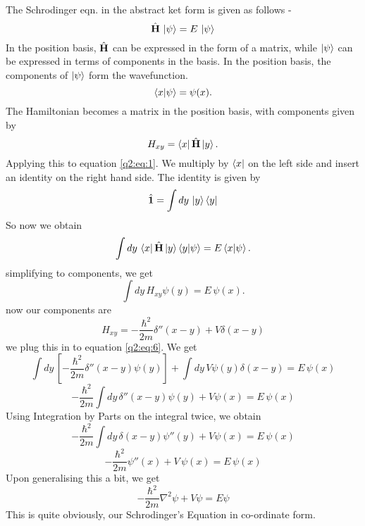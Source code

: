 
The Schrodinger eqn. in the abstract ket form is given as follows -
    \begin{equation} \label{q2:eq:1}
        \hat{\textbf{H}} \, \ket{\psi} = E\, \ket{\psi}
    \end{equation}
In the position basis, $\hat{\textbf{H}}$ can be expressed in the form of a matrix, while $\ket{\psi}$ can be expressed in terms of components in the basis.
In the position basis, the components of $\ket{\psi}$ form the wavefunction.
    \begin{equation}
        \braket{x}{\psi} = \psi(x).
    \end{equation}
The Hamiltonian becomes a matrix in the position basis, with components given by 
    \begin{equation}
        H_{xy} = \bra{x}\hat{\textbf{H}}\ket{y}.
    \end{equation}
Applying this to equation \ref{q2:eq:1}. We multiply by $\bra{x}$ on the left side and insert an identity on the right hand side.
The identity is given by 
    \begin{equation}
        \hat{\textbf{1}} = \int dy\, \ket{y}\bra{y}
    \end{equation}
So now we obtain 
    \begin{equation}
        \int dy\, \bra{x}\hat{\textbf{H}}\ket{y}\braket{y}{\psi} = E \braket{x}{\psi}.
    \end{equation}
simplifying to components, we get 
    \begin{equation} \label{q2:eq:6}
        \int dy \, H_{xy} \psi(y) = E \, \psi(x).
    \end{equation}
now our components are 
    \begin{equation}
        H_{xy} = -\frac{\hbar^2}{2m}\delta''(x-y) + V\delta(x-y)
    \end{equation}
we plug this in to equation \ref{q2:eq:6}. We get  
    \begin{equation}
        \int dy \, [-\frac{\hbar^2}{2m}\delta''(x-y) \psi(y)] + \int dy \, V\psi(y)\delta(x-y) = E \, \psi(x)
    \end{equation}
    \begin{equation}
        - \frac{\hbar^2}{2m} \int dy \, \delta''(x-y) \psi(y) + V \psi(x) = E\,  \psi(x)        
    \end{equation}
Using Integration by Parts on the integral twice, we obtain 
    \begin{equation}
        - \frac{\hbar^2}{2m} \int dy \, \delta(x-y) \psi''(y) + V \psi(x) = E\,  \psi(x)        
    \end{equation}
    \begin{equation}
        - \frac{\hbar^2}{2m} \psi''(x) + V\, \psi(x) = E\,  \psi(x)        
    \end{equation}
Upon generalising this a bit, we get
    \begin{equation}
        - \frac{\hbar^2}{2m} \nabla^2 \psi + V \psi = E \psi        
    \end{equation}
This is quite obviously, our Schrodinger's Equation in co-ordinate form.
